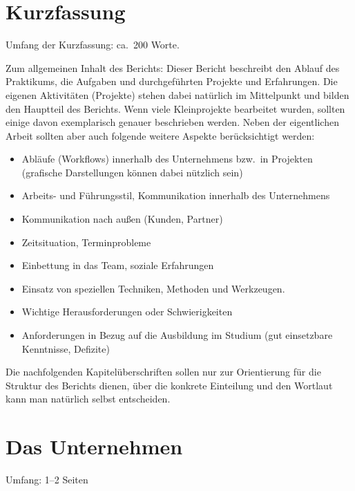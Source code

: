 \documentclass[internship,german,smartquotes]{hgbthesis}
\author{Peter A.\ Schlaumeier}
\begin{document}
\frontmatter
\maketitle
\tableofcontents

\chapter{Kurzfassung}
Umfang der Kurzfassung: ca.\ 200 Worte.

Zum allgemeinen Inhalt des Berichts: Dieser Bericht beschreibt den Ablauf des Praktikums, die Aufgaben und durchgeführten Projekte und Erfahrungen. Die eigenen Aktivitäten (Projekte) stehen dabei natürlich im Mittelpunkt und bilden den Hauptteil des Berichts. Wenn viele Kleinprojekte bearbeitet wurden, sollten einige davon exemplarisch
genauer beschrieben werden. Neben der eigentlichen Arbeit sollten aber auch folgende weitere Aspekte berücksichtigt werden:
%
\begin{itemize}
\item Abläufe (Workflows) innerhalb des Unternehmens bzw.\ in Projekten (grafische Darstellungen
können dabei nützlich sein)
\item Arbeits- und Führungsstil, Kommunikation innerhalb des Unternehmens
\item Kommunikation nach außen (Kunden, Partner)
\item Zeitsituation, Terminprobleme
\item Einbettung in das Team, soziale Erfahrungen
\item Einsatz von speziellen Techniken, Methoden und Werkzeugen.
\item Wichtige Herausforderungen oder Schwierigkeiten
\item Anforderungen in Bezug auf die Ausbildung im Studium (gut einsetzbare Kenntnisse, Defizite)
\end{itemize}
%
Die nachfolgenden Kapitelüberschriften sollen nur zur Orientierung für die Struktur des Berichts dienen, über die konkrete Einteilung und den Wortlaut kann man natürlich selbst entscheiden.

\mainmatter           %

\chapter{Das Unternehmen}
Umfang: 1--2 Seiten
\end{document}

